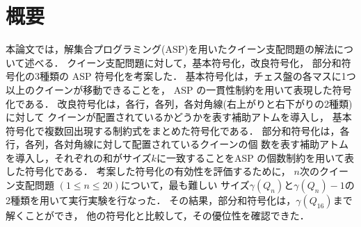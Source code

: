 \chapter*{概要}

本論文では，解集合プログラミング(ASP)を用いたクイーン支配問題の解法について述べる．
クイーン支配問題に対して，基本符号化，改良符号化，
部分和符号化の3種類の ASP 符号化を考案した．
%
基本符号化は，チェス盤の各マスに1つ以上のクイーンが移動できることを，
ASP の一貫性制約を用いて表現した符号化である．
%
改良符号化は，各行，各列，各対角線(右上がりと右下がりの2種類)に対して
クイーンが配置されているかどうかを表す補助アトムを導入し，
基本符号化で複数回出現する制約式をまとめた符号化である．
%
部分和符号化は，各行，各列，各対角線に対して配置されているクイーンの個
数を表す補助アトムを導入し，それぞれの和がサイズ$k$に一致することをASP
の個数制約を用いて表した符号化である．
%
考案した符号化の有効性を評価するために，
$n$次のクイーン支配問題 $(1\leq n\leq 20)$について，最も難しい
サイズ$\gamma(Q_n)$と$\gamma(Q_n)-1$の2種類を用いて実行実験を行なった．
その結果，部分和符号化は，$\gamma(Q_{16})$まで解くことができ，
他の符号化と比較して，その優位性を確認できた．



